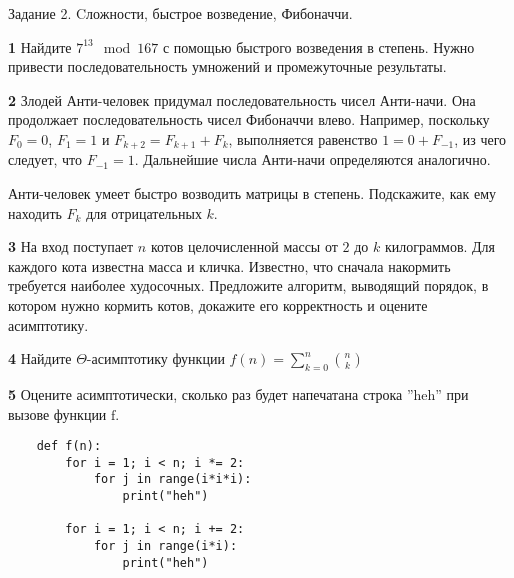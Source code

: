 \documentclass{article}
\begin{document}
\begin{center}
\Large {Задание 2. Cложности, быстрое возведение, Фибоначчи.}
\end{center}

\bigskip

\textbf{1} Найдите $7^{13} \mod 167$ с помощью быстрого возведения в степень. Нужно привести последовательность умножений и промежуточные результаты.

\medskip

\textbf{2} Злодей Анти-человек придумал последовательность чисел Анти-начи. Она продолжает последовательность чисел Фибоначчи влево. Например, поскольку $F_0 = 0$, $F_1 = 1$ и $F_{k+2} = F_{k+1} + F_k$, выполняется равенство $1 = 0 + F_{-1}$, из чего следует, что $F_{-1} = 1$. Дальнейшие числа Анти-начи определяются аналогично.

Анти-человек умеет быстро возводить матрицы в степень. Подскажите, как ему находить $F_k$ для отрицательных $k$.

\medskip

\textbf{3} На вход поступает $n$ котов целочисленной массы от $2$ до $k$ килограммов.
Для каждого кота известна масса и кличка.
Известно, что сначала накормить требуется наиболее худосочных.
Предложите алгоритм, выводящий порядок, в котором нужно кормить котов, докажите его корректность и оцените асимптотику.

\medskip

\textbf{4} Найдите $\Theta$-асимптотику функции $f(n) = \sum^n_{k=0} {n \choose k}$

\medskip

\textbf{5} Оцените асимптотически, сколько раз будет напечатана строка ''heh'' при вызове функции $\text{f}$.

\begin{verbatim}
    def f(n):
        for i = 1; i < n; i *= 2:
            for j in range(i*i*i):
                print("heh")

        for i = 1; i < n; i += 2:
            for j in range(i*i):
                print("heh")
\end{verbatim}
\end{document}
